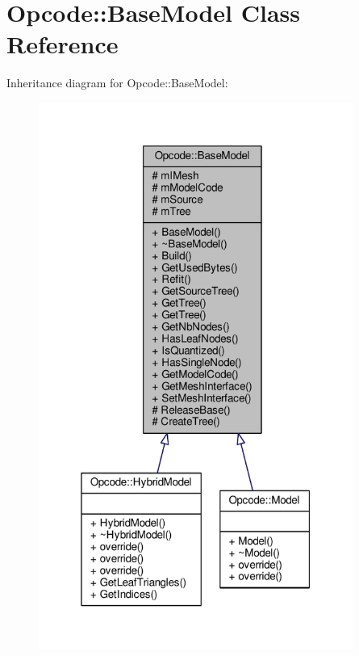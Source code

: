 \hypertarget{classOpcode_1_1BaseModel}{}\section{Opcode\+:\+:Base\+Model Class Reference}
\label{classOpcode_1_1BaseModel}


Inheritance diagram for Opcode\+:\+:Base\+Model\+:
\nopagebreak
\begin{figure}[H]
\begin{center}
\leavevmode
\includegraphics[width=292pt]{d8/daa/classOpcode_1_1BaseModel__inherit__graph}
\end{center}
\end{figure}


